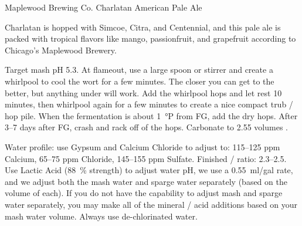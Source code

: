 \begin{recipie}{Maplewood Brewing Co. Charlatan American Pale Ale}

\begin{aboutblock}
Charlatan is hopped with Simcoe, Citra, and Centennial, and this pale ale is packed with
tropical flavors like mango, passionfruit, and grapefruit according to Chicago's Maplewood
Brewery.
\end{aboutblock}


\begin{methodandtiming}
 
\begin{mashsteps}
\end{mashsteps}

\begin{directions}
Target mash pH 5.3. At flameout, use a large spoon or stirrer
and create a whirlpool to cool the wort for a few minutes. The closer you can get to 
the better, but anything under  will work. Add the whirlpool hops and let rest 10
minutes, then whirlpool again for a few minutes to create a nice compact trub / hop pile.
When the fermentation is about 1~°P from FG, add the dry hops. After 3--7 days after FG, crash
and rack off of the hops. Carbonate to 2.55 volumes .

Water profile: use Gypsum and Calcium Chloride to adjust to: 115--125 ppm Calcium,
65--75 ppm Chloride, 145--155 ppm Sulfate. Finished / ratio: 2.3--2.5.
Use Lactic Acid (88~\% strength) to adjust water pH, we use a 0.55~ml/gal rate, and we
adjust both the mash water and sparge water separately (based on the volume of each).
If you do not have the capability to adjust mash and sparge water separately, you may
make all of the mineral / acid additions based on your mash water volume. Always use
de-chlorinated water.
\end{directions}

\end{methodandtiming}

\begin{ingredientsblock}

\begin{malts}
\end{malts}


\end{ingredientsblock}
\end{recipie}
